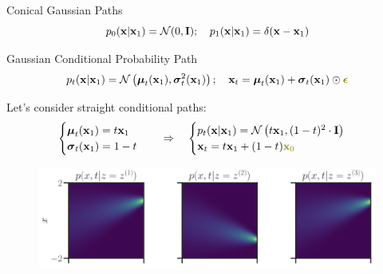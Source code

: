 \documentclass{beamer}
\begin{document}
\begin{frame}{Conical Gaussian Paths}
	\[
		p_0(\mathbf{x} | \mathbf{x}_1) = \mathcal{N}(0, \mathbf{I}); \quad p_1(\mathbf{x} | \mathbf{x}_1) = \delta(\mathbf{x} - \mathbf{x}_1)
	\]
	
	\begin{block}{Gaussian Conditional Probability Path}
		\vspace{-0.5cm}
		\[
			p_t(\bx | \bx_1) = \cN\left(\bmu_t(\bx_1), \bsigma_t^2(\bx_1)\right); \quad \bx_t = \bmu_t(\bx_1) +  \bsigma_t(\bx_1) \odot {\color{olive}\bepsilon}
		\]
		\vspace{-0.6cm}
	\end{block}
	Let's consider straight conditional paths:	
	\[
		\begin{cases}
			\bmu_t(\bx_1) = t \bx_1 \\
			\bsigma_t(\bx_1) = 1 - t
		\end{cases}
		\quad \Rightarrow \quad 
		\begin{cases}
			p_t(\bx | \bx_1) = \cN\left(t \bx_1, (1-t)^2 \cdot \bI\right) \\
		 	\bx_t = t \bx_1 + (1 - t) {\color{olive}\bx_0}
	 \end{cases}
	\]
	\vspace{-0.3cm}
	\begin{figure}
		\centering
		\includegraphics[width=\linewidth]{figs/conical_paths}
	\end{figure}
\end{frame}
\end{document}
